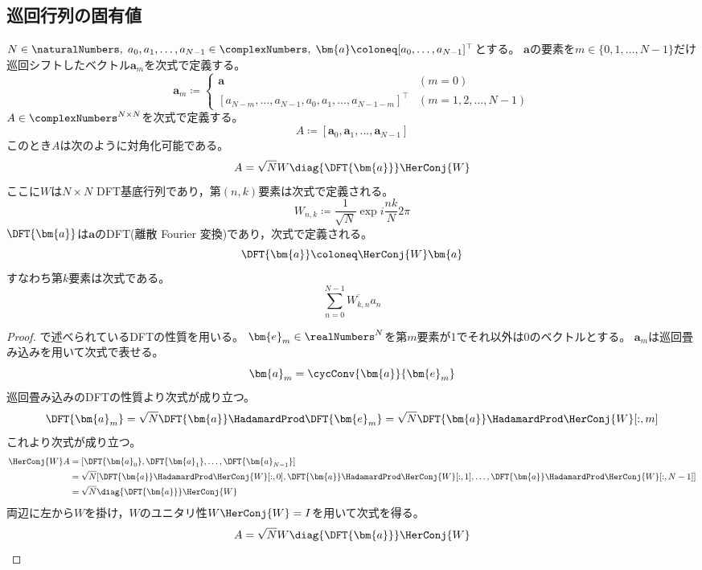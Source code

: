         \subsection{巡回行列の固有値}
            \begin{shadebox}
                $N\in\naturalNumbers,\;a_0,a_1,\dots,a_{N-1}\in\complexNumbers,\;\bm{a}\coloneq[a_0,\dots,a_{N-1}]^\top$とする。
                $\bm{a}$の要素を$m\in\{0,1,\dots,N-1\}$だけ巡回シフトしたベクトル$\bm{a}_m$を次式で定義する。
                \[
                    \bm{a}_m \coloneq
                    \begin{cases}
                        \bm{a} & (m=0) \\
                        [a_{N-m},\dots,a_{N-1},a_0,a_1,\dots,a_{N-1-m}]^\top & (m=1,2,\dots,N-1)
                    \end{cases}
                \]
                $A\in\complexNumbers^{N\times N}$を次式で定義する。
                \[ A \coloneq [\bm{a}_0,\bm{a}_1,\dots,\bm{a}_{N-1}] \]
                このとき$A$は次のように対角化可能である。
                \[ A = \sqrt{N}W\diag{\DFT{\bm{a}}}\HerConj{W} \]
                ここに$W$は$N\times N$ DFT基底行列であり，第$(n,k)$要素は次式で定義される。
                \[ W_{n,k} \coloneq \frac{1}{\sqrt{N}}\exp i\frac{nk}{N}2\pi \]
                $\DFT{\bm{a}}$は$\bm{a}$のDFT(離散 Fourier 変換)であり，次式で定義される。
                \[ \DFT{\bm{a}} \coloneq \HerConj{W}\bm{a} \]
                すなわち第$k$要素は次式である。
                \[ \sum_{n=0}^{N-1}\overline{W_{k,n}}a_n \]
            \end{shadebox}
            \begin{proof}
                \quad\par
                \cite{信号処理備忘録}で述べられているDFTの性質を用いる。
                $\bm{e}_m\in\realNumbers^N$を第$m$要素が1でそれ以外は0のベクトルとする。
                $\bm{a}_m$は巡回畳み込みを用いて次式で表せる。
                \[ \bm{a}_m = \cycConv{\bm{a}}{\bm{e}_m} \]
                巡回畳み込みのDFTの性質より次式が成り立つ。
                \[ \DFT{\bm{a}_m} = \sqrt{N}\DFT{\bm{a}}\HadamardProd\DFT{\bm{e}_m} = \sqrt{N}\DFT{\bm{a}}\HadamardProd \HerConj{W}[:,m] \]
                これより次式が成り立つ。
                \begin{align*}
                    \HerConj{W}A &= [\DFT{\bm{a}_0},\DFT{\bm{a}_1},\dots,\DFT{\bm{a}_{N-1}}] \\
                    &= \sqrt{N}[\DFT{\bm{a}}\HadamardProd \HerConj{W}[:,0],\DFT{\bm{a}}\HadamardProd \HerConj{W}[:,1],\dots,\DFT{\bm{a}}\HadamardProd \HerConj{W}[:,N-1]] \\
                    &= \sqrt{N}\diag{\DFT{\bm{a}}}\HerConj{W}
                \end{align*}
                両辺に左から$W$を掛け，$W$のユニタリ性$W\HerConj{W} = I$を用いて次式を得る。
                \[ A = \sqrt{N}W\diag{\DFT{\bm{a}}}\HerConj{W} \]
            \end{proof}
